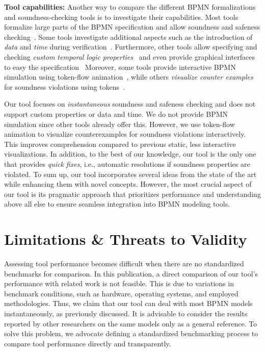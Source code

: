\documentclass[runningheads]{llncs}
\begin{document}
\textbf{Tool capabilities:}
Another way to compare the different BPMN formalizations and soundness-checking tools is to investigate their capabilities.
Most tools formalize large parts of the BPMN specification and allow soundness and safeness checking~\cite{corradiniFormalApproachAnalysis2021,houhouFirstOrderLogicVerification2022,krauterFormalizationAnalysisBPMN2023,krauterHigherorderTransformationApproach2023}.
Some tools investigate additional aspects such as the introduction of \textit{data} and \textit{time} during verification~\cite{corradiniFormalisingAnimatingMultiple2022,houhouFirstOrderLogicVerification2022}.
Furthermore, other tools allow specifying and checking \textit{custom temporal logic properties}~\cite{corradiniFormalApproachAnalysis2021,krauterFormalizationAnalysisBPMN2023} and even provide graphical interfaces to easy the specification~\cite{krauterHigherorderTransformationApproach2023}
Moreover, some tools provide interactive BPMN simulation using token-flow animation~\cite{camundaservicesgmbhBpmnjsTokenSimulation2024,corradiniFormalisingAnimatingMultiple2022}, while others \textit{visualize counter examples} for soundness violations using tokens~\cite{houhouFirstOrderLogicVerification2022}.

Our tool focuses on \textit{instantaneous} soundness and safeness checking and does not support custom properties or data and time.
We do not provide BPMN simulation since other tools already offer this.
However, we use token-flow animation to visualize counterexamples for soundness violations interactively.
This improves comprehension compared to previous static, less interactive visualizations.
In addition, to the best of our knowledge, our tool is the only one that provides \textit{quick fixes}, i.e., automatic resolutions if soundness properties are violated.
To sum up, our tool incorporates several ideas from the state of the art while enhancing them with novel concepts.
However, the most crucial aspect of our tool is its pragmatic approach that prioritizes performance and understanding above all else to ensure seamless integration into BPMN modeling tools.

\section{Limitations \& Threats to Validity}
Assessing tool performance becomes difficult when there are no standardized benchmarks for comparison.
In this publication, a direct comparison of our tool's performance with related work is not feasible.
This is due to variations in benchmark conditions, such as hardware, operating systems, and employed methodologies.
Thus, we claim that our tool can deal with most BPMN models instantaneously, as previously discussed.
It is advisable to consider the results reported by other researchers on the same models only as a general reference.
To solve this problem, we advocate defining a standardized benchmarking process to compare tool performance directly and transparently.
\end{document}
